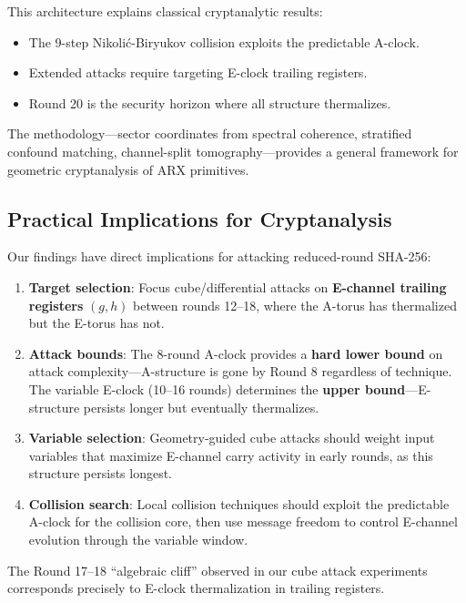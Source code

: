 \documentclass[11pt,a4paper]{article}
\theoremstyle{plain}
\theoremstyle{definition}
\theoremstyle{remark}
\begin{document}
This architecture explains classical cryptanalytic results:
\begin{itemize}
    \item The 9-step Nikoli\'{c}-Biryukov collision exploits the predictable A-clock.
    \item Extended attacks require targeting E-clock trailing registers.
    \item Round 20 is the security horizon where all structure thermalizes.
\end{itemize}

The methodology---sector coordinates from spectral coherence, stratified confound matching, channel-split tomography---provides a general framework for geometric cryptanalysis of ARX primitives.

\subsection{Practical Implications for Cryptanalysis}

Our findings have direct implications for attacking reduced-round SHA-256:

\begin{enumerate}
    \item \textbf{Target selection}: Focus cube/differential attacks on \textbf{E-channel trailing registers} $(g, h)$ between rounds 12--18, where the A-torus has thermalized but the E-torus has not.
    
    \item \textbf{Attack bounds}: The 8-round A-clock provides a \textbf{hard lower bound} on attack complexity---A-structure is gone by Round 8 regardless of technique. The variable E-clock (10--16 rounds) determines the \textbf{upper bound}---E-structure persists longer but eventually thermalizes.
    
    \item \textbf{Variable selection}: Geometry-guided cube attacks should weight input variables that maximize E-channel carry activity in early rounds, as this structure persists longest.
    
    \item \textbf{Collision search}: Local collision techniques should exploit the predictable A-clock for the collision core, then use message freedom to control E-channel evolution through the variable window.
\end{enumerate}

The Round 17--18 ``algebraic cliff'' observed in our cube attack experiments corresponds precisely to E-clock thermalization in trailing registers.
\end{document}
